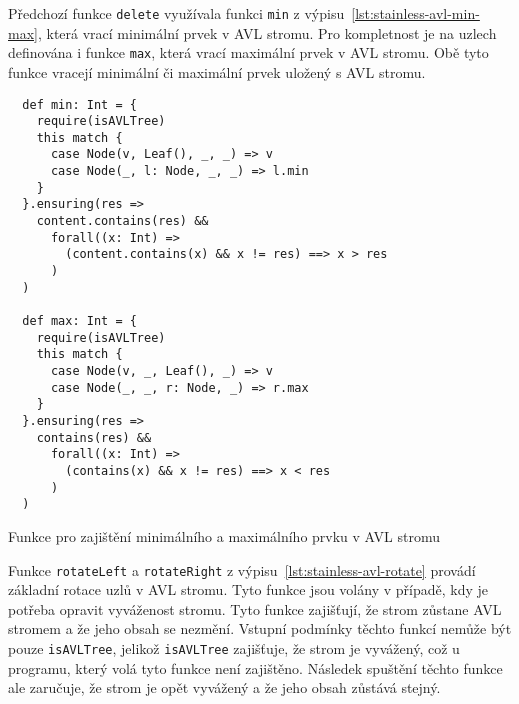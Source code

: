 Předchozí funkce \texttt{delete} využívala funkci \texttt{min} z výpisu~\ref{lst:stainless-avl-min-max},
která vrací minimální prvek v AVL stromu.
Pro kompletnost je na uzlech definována i funkce \texttt{max},
která vrací maximální prvek v AVL stromu.
Obě tyto funkce vracejí minimální či maximální prvek uložený s AVL stromu.

\begin{listing}[H]
  \begin{verbatim}
  def min: Int = {
    require(isAVLTree)
    this match {
      case Node(v, Leaf(), _, _) => v
      case Node(_, l: Node, _, _) => l.min
    }
  }.ensuring(res =>
    content.contains(res) &&
      forall((x: Int) =>
        (content.contains(x) && x != res) ==> x > res
      )
  )

  def max: Int = {
    require(isAVLTree)
    this match {
      case Node(v, _, Leaf(), _) => v
      case Node(_, _, r: Node, _) => r.max
    }
  }.ensuring(res =>
    contains(res) &&
      forall((x: Int) =>
        (contains(x) && x != res) ==> x < res
      )
  )
  \end{verbatim}
  \caption{Funkce pro zajištění minimálního a maximálního prvku v AVL stromu}
  \label{lst:stainless-avl-min-max}
\end{listing}

Funkce \texttt{rotateLeft} a \texttt{rotateRight}
z výpisu~\ref{lst:stainless-avl-rotate}
provádí základní rotace uzlů v AVL stromu.
Tyto funkce jsou volány v případě, kdy je potřeba opravit vyváženost stromu.
Tyto funkce zajišťují, že strom zůstane AVL stromem a že jeho obsah se nezmění.
Vstupní podmínky těchto funkcí nemůže být pouze \texttt{isAVLTree},
jelikož \texttt{isAVLTree} zajišťuje, že strom je vyvážený,
což u programu, který volá tyto funkce není zajištěno.
Následek spuštění těchto funkce ale zaručuje,
že strom je opět vyvážený a že jeho obsah zůstává stejný.

